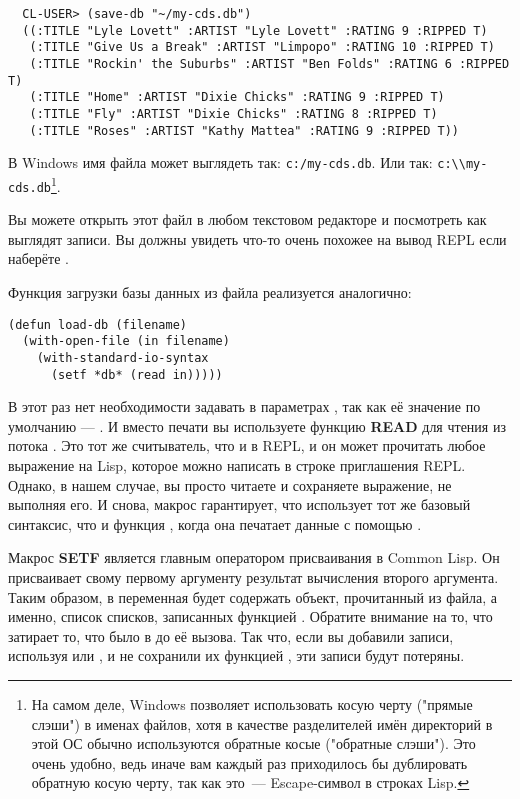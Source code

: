 \begin{verbatim}
  CL-USER> (save-db "~/my-cds.db")
  ((:TITLE "Lyle Lovett" :ARTIST "Lyle Lovett" :RATING 9 :RIPPED T)
   (:TITLE "Give Us a Break" :ARTIST "Limpopo" :RATING 10 :RIPPED T)
   (:TITLE "Rockin' the Suburbs" :ARTIST "Ben Folds" :RATING 6 :RIPPED T)
   (:TITLE "Home" :ARTIST "Dixie Chicks" :RATING 9 :RIPPED T)
   (:TITLE "Fly" :ARTIST "Dixie Chicks" :RATING 8 :RIPPED T)
   (:TITLE "Roses" :ARTIST "Kathy Mattea" :RATING 9 :RIPPED T))
\end{verbatim}

В Windows имя файла может выглядеть так: \lstinline!c:/my-cds.db!. Или так:
\lstinline!c:\\my-cds.db!\footnote{На самом деле, Windows позволяет использовать косую
  черту ("прямые слэши") в именах файлов, хотя в качестве разделителей имён директорий в
  этой ОС обычно используются обратные косые ("обратные слэши"). Это очень удобно, ведь
  иначе вам каждый раз приходилось бы дублировать обратную косую черту, так как это~---
  Escape-символ в строках Lisp.}.

Вы можете открыть этот файл в любом текстовом редакторе и посмотреть как выглядят
записи. Вы должны увидеть что-то очень похожее на вывод REPL если наберёте .

Функция загрузки базы данных из файла реализуется аналогично:

\begin{lstlisting}
(defun load-db (filename)
  (with-open-file (in filename)
    (with-standard-io-syntax
      (setf *db* (read in)))))
\end{lstlisting}

В этот раз нет необходимости задавать  в параметрах
, так как её значение по умолчанию --- . И вместо печати
вы используете функцию \textbf{READ} для чтения из потока . Это тот же
считыватель, что и в REPL, и он может прочитать любое выражение на Lisp, которое можно
написать в строке приглашения REPL. Однако, в нашем случае, вы просто читаете и сохраняете
выражение, не выполняя его. И снова, макрос  гарантирует,
что  использует тот же базовый синтаксис, что и функция , когда
она печатает данные с помощью .

Макрос \textbf{SETF} является главным оператором присваивания в Common Lisp. Он
присваивает свому первому аргументу результат вычисления второго аргумента. Таким образом,
в  переменная  будет содержать объект, прочитанный из файла, а
именно, список списков, записанных функцией . Обратите внимание на то, что
 затирает то, что было в  до её вызова. Так что, если вы добавили
записи, используя  или , и не сохранили их функцией
, эти записи будут потеряны.

